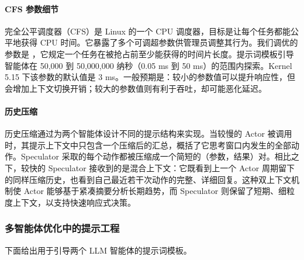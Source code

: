 \paragraph{CFS 参数细节}
完全公平调度器（CFS）是 Linux 的一个 CPU 调度器，目标是让每个任务都能公平地获得 CPU 时间。它暴露了多个可调超参数供管理员调整其行为。我们调优的参数是 ，它规定一个任务在被抢占前至少能获得的时间片长度。提示词模板引导智能体在 50,000 到 50,000,000 纳秒（0.05 ms 到 50 ms）的范围内探索。Kernel 5.15 下该参数的默认值是 3 ms。一般预期是：较小的参数值可以提升响应性，但会增加上下文切换开销；较大的参数值则有利于吞吐，却可能恶化延迟。

\paragraph{历史压缩}
\label{app:history_os}
历史压缩通过为两个智能体设计不同的提示结构来实现。当较慢的 Actor 被调用时，其提示上下文中只包含一个压缩后的汇总，概括了它思考窗口内发生的全部动作。Speculator 采取的每个动作都被压缩成一个简短的（参数，结果）对。相比之下，较快的 Speculator 接收到的是混合上下文：它既看到上一个 Actor 周期留下的同样压缩历史，也看到自己最近若干次动作的完整、详细回复。这种双上下文机制使 Actor 能够基于紧凑摘要分析长期趋势，而 Speculator 则保留了短期、细粒度上下文，以支持快速响应式决策。

\subsubsection{多智能体优化中的提示工程}
\label{app:prompt_os}
下面给出用于引导两个 LLM 智能体的提示词模板。

